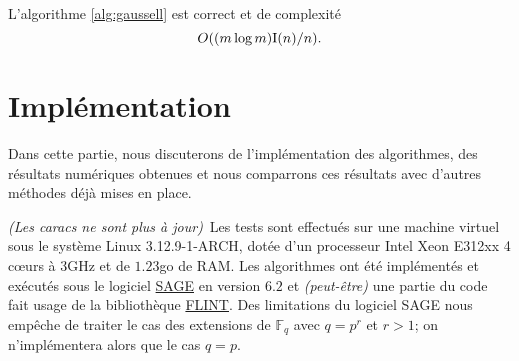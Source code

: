 \documentclass[a4paper]{article} %
\numberwithin{section}{part}
\numberwithin{equation}{section}
\newcommand\GF[1]{\mathbb{F}_{#1}}
\newcommand\I[1]{\textup{I}(#1)}
\begin{document}
\begin{prop}
L'algorithme \ref{alg:gaussell} est correct et de complexité 
\begin{equation}
O((m\,\textup{log\,}m)\I{n}/n).
\end{equation}
\end{prop}


\part{Implémentation}
\label{trois}
Dans cette partie, nous discuterons de l'implémentation des algorithmes, des
résultats numériques obtenues et nous comparrons ces résultats avec d'autres
méthodes déjà mises en place.\par
\emph{(Les caracs ne sont plus à jour)}\,
Les tests sont effectués sur une machine virtuel sous le système Linux 
3.12.9-1-ARCH, dotée d'un processeur Intel Xeon E312xx 4 c\oe urs à 
$3$GHz et de $1.23$go de RAM. Les algorithmes ont été implémentés et 
exécutés sous le logiciel \href{http://www.sagemath.org/}{SAGE} en version 
$6.2$ et \emph{(peut-être)} une partie du code fait usage de la bibliothèque
\href{http://www.flintlib.org/}{FLINT}. Des limitations du logiciel SAGE nous
empêche de traiter le cas des extensions de $\GF{q}$ avec $q = p^r$ et $r>1$; on
n'implémentera alors que le cas $q = p$.
\end{document}
